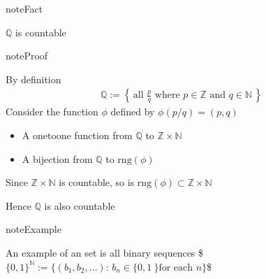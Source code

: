 \documentclass[letterpaper,10pt,english]{jupyterBook}
\begin{document}
\begin{figure}[htbp]
\centering

\noindent{}
\end{figure}

\begin{sphinxadmonition}{note}{Fact}

\sphinxAtStartPar
\(\mathbb{Q}\) is countable
\end{sphinxadmonition}

\begin{sphinxadmonition}{note}{Proof}

\sphinxAtStartPar
By definition
\begin{equation*}
\begin{split}
\mathbb{Q}:= 
\left\{ \, 
\text{all } \frac{p}{q}
\text{ where } p \in \mathbb{Z} \text{ and }  q \in \mathbb{N} \,
\right\}
\end{split}
\end{equation*}
\sphinxAtStartPar
Consider the function \(\phi\) defined by \(\phi(p/q) = (p, q)\)
\begin{itemize}
\item {} 
\sphinxAtStartPar
A one\sphinxhyphen{}to\sphinxhyphen{}one function from \(\mathbb{Q}\) to \(\mathbb{Z} \times \mathbb{N}\)

\item {} 
\sphinxAtStartPar
A bijection from \(\mathbb{Q}\) to \(\mathrm{rng}(\phi)\)

\end{itemize}

\sphinxAtStartPar
Since \(\mathbb{Z} \times \mathbb{N}\) is countable, so is \(\mathrm{rng}(\phi) \subset \mathbb{Z} \times \mathbb{N}\)

\sphinxAtStartPar
Hence \(\mathbb{Q}\) is also countable
\end{sphinxadmonition}

\begin{sphinxadmonition}{note}{Example}

\sphinxAtStartPar
An example of an  set is all binary sequences
\$\(
\{0,1\}^{\mathbb{N}} := \big\{ (b_1,b_2,\ldots) :  \, b_n \in \{0,1\ \} \text{
for each } n \big\}
\)\$
\end{sphinxadmonition}
\end{document}
